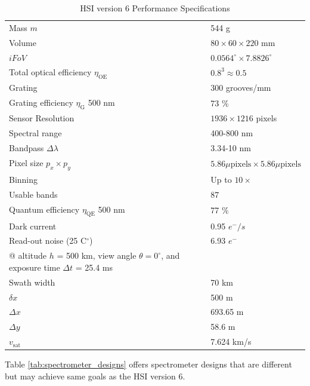 \begin{table}[htbp]
	\caption{HSI version 6 Performance Specifications}
	\label{tab:specs}
	\centering
			\begin{tabular}{p{4cm} p{4cm}}
				\hline
				Mass $m$ & 544 g \\
				Volume & $80 \times 60 \times 220 $ mm \\
				$iFoV$ &	$0.0564^{\circ} \times 7.8826^{\circ}$  \\
				Total optical efficiency $\eta_{\text{OE}}$ & $0.8^3 \approx 0.5$ \\
				Grating & 300 grooves/mm \\
				Grating efficiency $\eta_{\text{G}}$ \@500 nm & 73 \% \\
				Sensor Resolution & $1936 \times 1216$ pixels \\
				Spectral range & 400-800 nm \\
				Bandpass $\Delta \lambda$ & 3.34-10 nm \\
				Pixel size $p_x \times p_y$ & $5.86 \mu\text{pixels} \times 5.86 \mu\text{pixels}$\\
				Binning & Up to $10\times$ \\
				Usable bands & 87 \\
				Quantum efficiency $\eta_{\text{QE}}$ \@500 nm & 77 \% \\
				Dark current & 0.95 $e^{-}/s$ \\
				Read-out noise (25 C$^{\circ}$) & 6.93 $e^{-}$ \\
				\hline
				@ altitude $h$ = 500 km, view angle $\theta=0^{\circ}$, and exposure time $\Delta t$ = 25.4 ms & \\
				\hline
				Swath width & 70 km \\
				$\delta x$ & 500 m \\
				$\Delta x$ & 693.65 m \\
				$\Delta y$ & 58.6 m \\
				$v_{\text{sat}}$ &  7.624 km/s\\
				\hline
				\end{tabular}
\end{table}
Table \ref{tab:spectrometer_designs} offers spectrometer designs that are different but may achieve same goals as the HSI version 6. 

